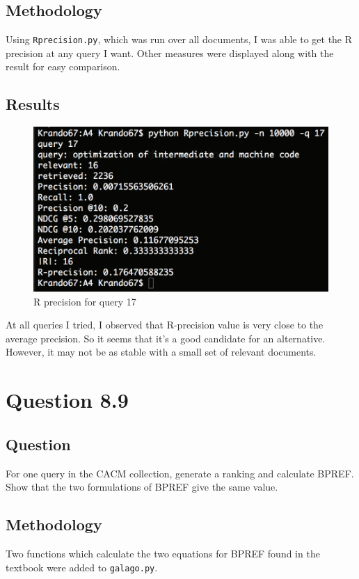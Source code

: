 \documentclass[10pt,letterpaper,bibliography=totoc]{scrartcl}
\begin{document}
\subsection{Methodology}
Using \texttt{Rprecision.py}, which was run over all documents, I was able to get the R precision at any query I want. Other measures were displayed along with the result for easy comparison. 

\subsection{Results}
\begin{figure}[h!]
\centering
\label{fig:rprecision}
\includegraphics[scale=.5]{rprecision.png}
\caption{R precision for query 17}
\end{figure}

At all queries I tried, I observed that R-precision value is very close to the average precision. So it seems that it's a good candidate for an alternative. However, it may not be as stable with a small set of relevant documents. 

\section{Question 8.9}
\subsection{Question}
For one query in the CACM collection, generate a ranking and calculate BPREF. Show that the two formulations of BPREF give the same value.

\subsection{Methodology}
Two functions which calculate the two equations for BPREF found in the textbook\cite{classtext} were added to \texttt{galago.py}.
\end{document}
